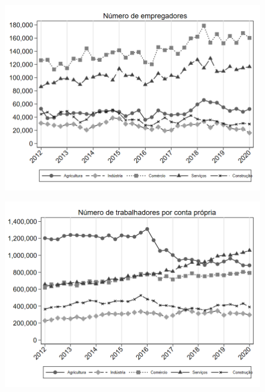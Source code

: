 \begin{frame}[label=_composicao_demografica_setor_n_empregador]{}
\textit{\hyperlink{_composicao_demografica_setor}{}}
\begin{figure}
  \centering
  \includegraphics[width=1.0\linewidth]{../../analysis/output/composicao_demografica/setor/_composicao_demografica_setor_n_empregador.png}
  \caption{}
  \label{fig:_composicao_demografica_setor_n_empregador}
\end{figure}
\end{frame}



\begin{frame}[label=_composicao_demografica_setor_n_cpropria]{}
\textit{\hyperlink{_composicao_demografica_setor}{}}
\begin{figure}
  \centering
  \includegraphics[width=1.0\linewidth]{../../analysis/output/composicao_demografica/setor/_composicao_demografica_setor_n_cpropria.png}
  \caption{}
  \label{fig:_composicao_demografica_setor_n_cpropria}
\end{figure}
\end{frame}

